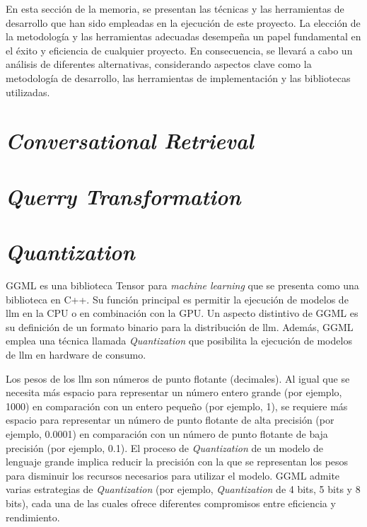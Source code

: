 
En esta sección de la memoria, se presentan las técnicas y las herramientas de desarrollo que han sido empleadas en la ejecución de este proyecto. La elección de la metodología y las herramientas adecuadas desempeña un papel fundamental en el éxito y eficiencia de cualquier proyecto. En consecuencia, se llevará a cabo un análisis de diferentes alternativas, considerando aspectos clave como la metodología de desarrollo, las herramientas de implementación y las bibliotecas utilizadas.

\section{\textit{Conversational Retrieval}}

\section{\textit{Querry Transformation}}

\section{\textit{Quantization}}

GGML es una biblioteca Tensor para \textit{machine learning} que se presenta como una biblioteca en C++. Su función principal es permitir la ejecución de modelos de \acrlong{llm} en la CPU o en combinación con la GPU. Un aspecto distintivo de GGML es su definición de un formato binario para la distribución de \acrshort{llm}. Además, GGML emplea una técnica llamada \textit{Quantization} que posibilita la ejecución de modelos de \acrshort{llm} en hardware de consumo\cite{GGML_Gimmi}.

Los pesos de los \acrshort{llm} son números de punto flotante (decimales). Al igual que se necesita más espacio para representar un número entero grande (por ejemplo, 1000) en comparación con un entero pequeño (por ejemplo, 1), se requiere más espacio para representar un número de punto flotante de alta precisión (por ejemplo, 0.0001) en comparación con un número de punto flotante de baja precisión (por ejemplo, 0.1). El proceso de \textit{Quantization} de un modelo de lenguaje grande implica reducir la precisión con la que se representan los pesos para disminuir los recursos necesarios para utilizar el modelo. GGML admite varias estrategias de \textit{Quantization} (por ejemplo, \textit{Quantization} de 4 bits, 5 bits y 8 bits), cada una de las cuales ofrece diferentes compromisos entre eficiencia y rendimiento.

